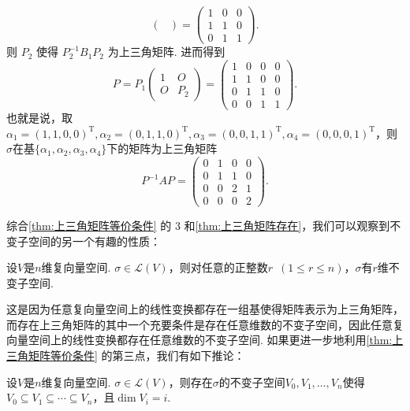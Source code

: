 \begin{solution}
\[\begin{pmatrix}
        \end{pmatrix}
        =
        \begin{pmatrix}
            1 & 0 & 0 \\
            1 & 1 & 0 \\
            0 & 1 & 1
        \end{pmatrix}.
    \]
    则 $P_2$ 使得 $P_2^{-1}B_1P_2$ 为上三角矩阵. 进而得到
    \[
        P = P_1 \begin{pmatrix}
            1 & O \\ O & P_2
        \end{pmatrix} = \begin{pmatrix}
            1 & 0 & 0 & 0 \\
            1 & 1 & 0 & 0 \\
            0 & 1 & 1 & 0 \\
            0 & 0 & 1 & 1
        \end{pmatrix}. \]
    也就是说，取 $\alpha_1=(1,1,0,0)^\mathrm{T}, \alpha_2=(0,1,1,0)^\mathrm{T}, \alpha_3=(0,0,1,1)^\mathrm{T}, \alpha_4=(0,0,0,1)^\mathrm{T}$，则$\sigma$在基$\{\alpha_1,\alpha_2,\alpha_3,\alpha_4\}$下的矩阵为上三角矩阵
    \[
        P^{-1}AP = \begin{pmatrix}
            0 & 1 & 0 & 0 \\
            0 & 1 & 1 & 0 \\
            0 & 0 & 2 & 1 \\
            0 & 0 & 0 & 2
        \end{pmatrix}. \]
\end{solution}

综合\autoref{thm:上三角矩阵等价条件} 的 3 和\autoref{thm:上三角矩阵存在}，我们可以观察到不变子空间的另一个有趣的性质：
\begin{corollary}{}{}
    设$V$是$n$维复向量空间. $\sigma\in \mathcal{L}(V)$，则对任意的正整数$r\enspace(1\leqslant r\leqslant n)$，$\sigma$有$r$维不变子空间.
\end{corollary}
这是因为任意复向量空间上的线性变换都存在一组基使得矩阵表示为上三角矩阵，而存在上三角矩阵的其中一个充要条件是存在任意维数的不变子空间，因此任意复向量空间上的线性变换都存在任意维数的不变子空间. 如果更进一步地利用\autoref{thm:上三角矩阵等价条件} 的第三点，我们有如下推论：
\begin{corollary}{}{}
    设$V$是$n$维复向量空间. $\sigma\in \mathcal{L}(V)$，则存在$\sigma$的不变子空间$V_0,V_1,\ldots,V_n$使得$V_0\subseteq V_1\subseteq\cdots\subseteq V_n$，且$\dim V_i=i$.
\end{corollary}

